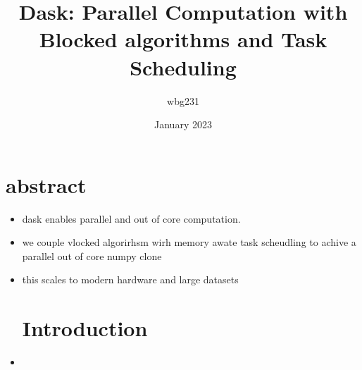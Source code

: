\documentclass{article}
\title{Dask: Parallel Computation with Blocked algorithms
and Task Scheduling}
\author{wbg231 }
\date{January 2023}
\begin{document}
\maketitle

\section{abstract }
\begin{itemize}
\item dask enables parallel and out of core computation. 
\item we couple vlocked algorirhsm wirh memory awate task scheudling to achive a parallel out of core numpy clone 
\item this scales to modern hardware and large datasets 
\section*{Introduction}
\item 
\end{itemize}
\end{document}
